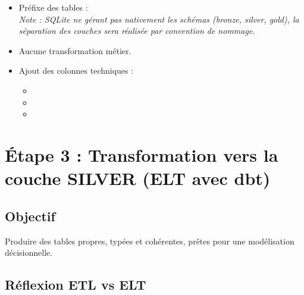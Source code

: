 \documentclass[11pt,a4paper]{article}
\begin{document}
\begin{itemize}
  \item Préfixe des tables : \\\textit{Note : SQLite ne gérant pas nativement les schémas (bronze, silver, gold), la séparation des couches sera réalisée par convention de nommage.}
  \item Aucune transformation métier.
  \item Ajout des colonnes techniques :
  \begin{itemize}
    \item {}
    \item {}
    \item {}
  \end{itemize}
\end{itemize}



\section{Étape 3 : Transformation vers la couche SILVER (ELT avec dbt)}

\subsection*{Objectif}

Produire des tables propres, typées et cohérentes,
prêtes pour une modélisation décisionnelle.

\subsection{Réflexion ETL vs ELT}
\end{document}
